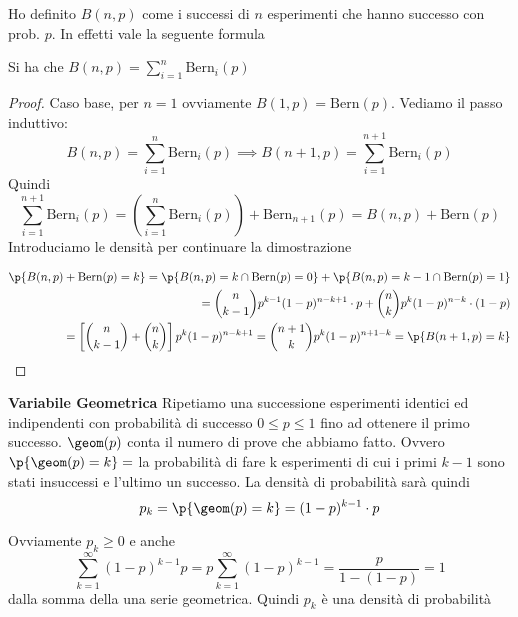 Ho definito $ B(n,p)$ come i successi di $ n $ esperimenti che hanno successo
con prob. $ p $. In effetti vale la seguente formula
\begin{prop}
	Si ha che $B(n,p)= \sum_{i=1}^{n} \text{Bern}_i(p) $
\end{prop}
    \begin{proof}
        Caso base, per $ n = 1$ ovviamente $B(1,p) = \text{Bern}(p)$. Vediamo il
        passo induttivo:
        \begin{equation*}
        B(n,p) = \sum_{i=1}^{n} \text{Bern}_i(p) \implies B(n+1,p) = \sum_{i=1}^{n+1} \text{Bern}_i(p)
        \end{equation*}
        Quindi
        $$\sum_{i=1}^{n+1} \text{Bern}_i(p) = \left( \sum_{i=1}^{n}
        \text{Bern}_i(p) \right) + \text{Bern}_{n+1}(p) = B(n,p) +
        \text{Bern}(p)$$ Introduciamo le densit\`a  per continuare la
        dimostrazione
        
        \begin{equation*}
        \begin{aligned}
        \p{B(n,p) + \text{Bern}(p) = k} = \p{B(n,p) = k \cap \text{Bern}(p) = 0} + \p{B(n,p) = k-1 \cap \text{Bern}(p) = 1} \\
        = \binom{n}{k-1}p^{k-1}(1-p)^{n-k+1} \cdot p + \binom{n}{k}p^k(1-p)^{n-k} \cdot  (1-p) \\
		= \left[\binom{n}{k-1}+\binom{n}{k}\right] p^k (1-p)^{n-k+1} = \binom{n+1}{k} p^k (1-p)^{n+1-k} = \p{B(n+1,p) = k}
        \end{aligned}
        \end{equation*}
    \end{proof}
    


\begin{defn}
    \textbf{Variabile Geometrica}
	Ripetiamo una successione esperimenti identici ed indipendenti con
	probabilit\`a  di successo $ 0 \leq p \leq 1 $  fino ad ottenere il primo
	successo. $ \geom(p) $ conta il numero di prove che abbiamo fatto. Ovvero $
	\p{\geom(p) = k} = $ la probabilit\`a  di fare k esperimenti di cui i primi
	$k-1$ sono stati insuccessi e l'ultimo un successo. La densit\`a  di
	probabilit\`a  sar\`a quindi
	$$ p_k = \p{\geom(p) = k} = (1-p)^{k-1} \cdot p $$
\end{defn}
Ovviamente $ p_k \geq 0 $ e anche
$$ \sum_{k=1}^{\infty} (1-p)^{k-1} p = p \sum_{k=1}^{\infty}(1-p)^{k-1}=
\dfrac{p}{1-(1-p)} = 1 $$ dalla somma della una serie geometrica. Quindi $p_k$
\`e una  densit\`a  di probabilit\`a

